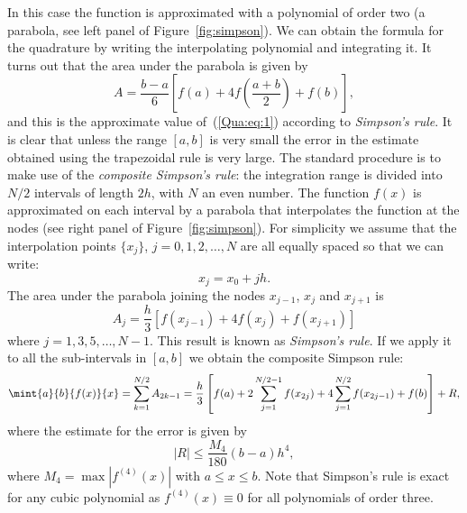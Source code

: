 In this case the function is approximated with a polynomial of order
two (a parabola, see left panel of Figure~\ref{fig:simpson}).  We can
obtain the formula for the quadrature by writing the interpolating
polynomial and integrating it.  It turns out that the area under the
parabola is given by
%
\begin{equation}
  A = \frac{b-a}{6}
  \left [ f(a) + 4 f\left(\frac{a+b}{2}\right) + f(b) \right ],
  \label{Qua:eq:33}
\end{equation}
%
and this is the approximate value of~(\ref{Qua:eq:1}) according to
\textit{Simpson's rule}.  It is clear that unless the range $[a,b]$ is
very small the error in the estimate obtained using the trapezoidal
rule is very large.  The standard procedure is to make use of the
\textit{composite Simpson's rule}: the integration range is divided
into $N/2$ intervals of length $2 h$, with $N$ an even number. The
function $f(x)$ is approximated on each interval by a parabola that
interpolates the function at the nodes (see right panel of
Figure~\ref{fig:simpson}).  For simplicity we assume that the
interpolation points $\{x_j\}$, $j=0,1,2,\ldots,N$ are all equally
spaced so that we can write:
%
\begin{equation*}
  x_j = x_0 + j h .
\end{equation*}
%
The area under the parabola joining the nodes $x_{j-1}$, $x_{j}$ and
$x_{j+1}$ is
%
\begin{equation}
  A_j = \frac{h}{3} \left[f(x_{j-1})+4f(x_{j})+f(x_{j+1})\right]
  \label{Qua:eq:9}
\end{equation}
%
where $j=1,3,5,\ldots, N-1$.  This result is known as
\textit{Simpson's rule}.  If we apply it to all the sub-intervals in
$[a,b]$ we obtain the composite Simpson rule:
%
\begin{equation}
  \mint{a}{b}{f(x)}{x} = \sum_{k=1}^{N/2} A_{2k-1} =
  \frac{h}{3} \left[ f(a) +
    2 \sum_{j=1}^{N/2-1} f(x_{2j}) +
    4 \sum_{j=1}^{N/2} f(x_{2j-1}) + f(b) \right] + R,
  \label{Qua:eq:10}
\end{equation}
%
where the estimate for the error is given by
%
\begin{equation}
  |R|\le \frac{M_4}{180}(b-a)h^4,\label{Qua:eq:11}
\end{equation}
%
where $M_4=\max|f^{(4)}(x)|$ with $a \le x \le b$.  Note that
Simpson's rule is exact for any cubic polynomial as $f^{(4)}(x) \equiv
0$ for all polynomials of order three.

